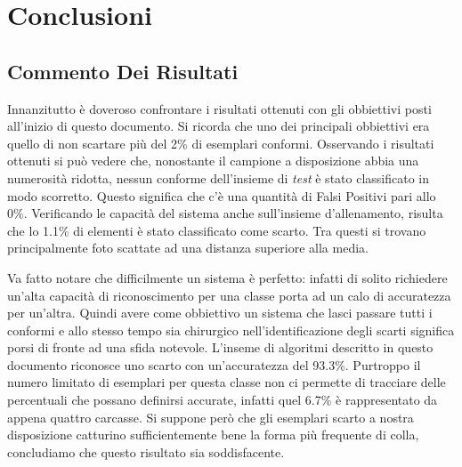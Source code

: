 
\chapter{Conclusioni}

\section{Commento Dei Risultati}
Innanzitutto è doveroso confrontare i risultati ottenuti con gli obbiettivi posti all'inizio di questo documento.
Si ricorda che uno dei principali obbiettivi era quello di non scartare più del 2\% di esemplari conformi.
Osservando i risultati ottenuti si può vedere che, nonostante il campione a disposizione abbia una numerosità ridotta, nessun conforme dell'insieme di \textit{test} è stato classificato in modo scorretto.
Questo significa che c'è una quantità di Falsi Positivi pari allo 0\%.
Verificando le capacità del sistema anche sull'insieme d'allenamento, risulta che lo 1.1\% di elementi è stato classificato come scarto.
Tra questi si trovano principalmente foto scattate ad una distanza superiore alla media.

Va fatto notare che difficilmente un sistema è perfetto: infatti di solito richiedere un'alta capacità di riconoscimento per una classe porta ad un calo di accuratezza per un'altra.
Quindi avere come obbiettivo un sistema che lasci passare tutti i conformi e allo stesso tempo sia chirurgico nell'identificazione degli scarti significa porsi di fronte ad una sfida notevole.
L'inseme di algoritmi descritto in questo documento riconosce uno scarto con un'accuratezza del 93.3\%.
Purtroppo il numero limitato di esemplari per questa classe non ci permette di tracciare delle percentuali che possano definirsi accurate, infatti quel 6.7\% è rappresentato da appena quattro carcasse.
Si suppone però che gli esemplari scarto a nostra disposizione catturino sufficientemente bene la forma più frequente di colla, concludiamo che questo risultato sia soddisfacente.

